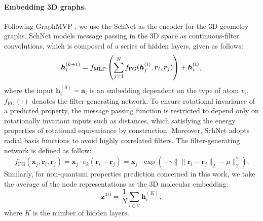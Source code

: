 \paragraph{Embedding 3D graphs.}
Following GraphMVP \cite{Liu:2022vr}, we use the SchNet \cite{Schutt:2017wh} as the encoder for the 3D geometry graphs.
SchNet models message passing in the 3D space as continuous-filter convolutions, which is composed of a series of hidden layers, given as follows:
\begin{equation}
    \bm{h}_i^{(k + 1)} = f_\text{MLP}\left(\sum_{j=1}^N f_\text{FG}(\bm{h}_j^{(t)}, \bm{r}_i, \bm{r}_j)\right) + \bm{h}_i^{(t)},\\
\end{equation}
where the input \(\bm{h}^{(0)}_i = \bm{a}_i\) is an embedding dependent on the type of atom \(v_i\), \(f_\text{FG}(\cdot)\) denotes the filter-generating network. 
To ensure rotational invariance of a predicted property, the message passing function is restricted to depend only on rotationally invariant inputs such as distances, which satisfying the energy properties of rotational equivariance by construction.
Moreover, SchNet adopts radial basis functions to avoid highly correlated filters. The filter-generating network is defined as follow:
\begin{equation}
	f_\text{FG}(\bm{x}_j, \bm{r}_i, \bm{r}_j) = \bm{x}_j\cdot e_k(\bm{r}_i - \bm{r}_j) = \bm{x}_j \cdot \exp (-\gamma \|\|\bm{r}_i - \bm{r}_j\|_2 - \mu \|_2^2).
\end{equation}
Similarly, for non-quantum properties prediction concerned in this work, we take the average of the node representations as the 3D molecular embedding:
\begin{equation}
	\bm{z}^\text{3D} = \frac{1}{N}\sum_{i\in \mathcal{V}}\bm{h}_i^{(K)},
\end{equation}
where $K$ is the number of hidden layers.

